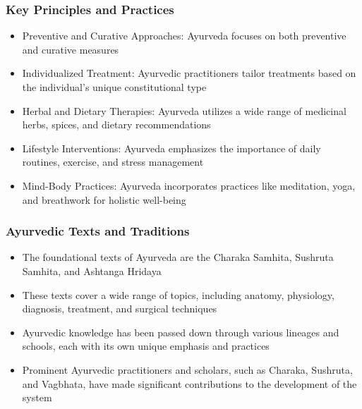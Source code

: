 \begin{frame}[fragile]\frametitle{Key Principles and Practices}
    \begin{itemize}
        \item Preventive and Curative Approaches: Ayurveda focuses on both preventive and curative measures
        \item Individualized Treatment: Ayurvedic practitioners tailor treatments based on the individual's unique constitutional type
        \item Herbal and Dietary Therapies: Ayurveda utilizes a wide range of medicinal herbs, spices, and dietary recommendations
        \item Lifestyle Interventions: Ayurveda emphasizes the importance of daily routines, exercise, and stress management
        \item Mind-Body Practices: Ayurveda incorporates practices like meditation, yoga, and breathwork for holistic well-being
    \end{itemize}
\end{frame}

\begin{frame}[fragile]\frametitle{Ayurvedic Texts and Traditions}
    \begin{itemize}
        \item The foundational texts of Ayurveda are the Charaka Samhita, Sushruta Samhita, and Ashtanga Hridaya
        \item These texts cover a wide range of topics, including anatomy, physiology, diagnosis, treatment, and surgical techniques
        \item Ayurvedic knowledge has been passed down through various lineages and schools, each with its own unique emphasis and practices
        \item Prominent Ayurvedic practitioners and scholars, such as Charaka, Sushruta, and Vagbhata, have made significant contributions to the development of the system
    \end{itemize}
\end{frame}

